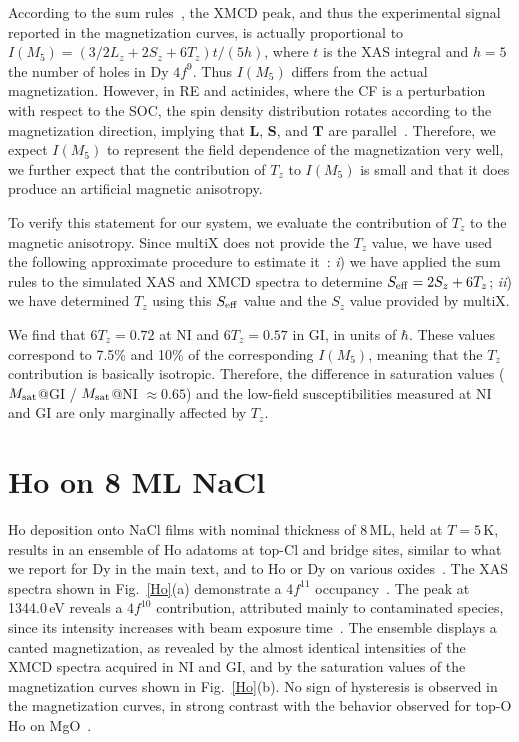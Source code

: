 {According to the sum rules~\cite{tho92, car93}, the XMCD peak, and thus the experimental signal reported in the magnetization curves, is actually proportional to $I(M_5) = (3/2L_z +2S_z + 6T_z)t/(5h)$, where $t$ is the XAS integral and $h=5$ the number of holes in Dy $4f^9$. Thus $I(M_5)$ differs from the actual magnetization. However, in RE and actinides, where the CF is a perturbation with respect to the SOC, the spin density distribution rotates according to the magnetization direction, implying that $\mathbf{L}$, $\mathbf{S}$, and $\mathbf{T}$ are parallel~\cite{ogu04}. Therefore, we expect $I(M_5)$ to represent the field dependence of the magnetization very well, we further expect that the contribution of $T_z$ to $I(M_5)$ is small and that it does produce an artificial magnetic anisotropy.

To verify this statement for our system, we evaluate the contribution of $T_z$ to the magnetic anisotropy. Since multiX does not provide the $T_z$ value, we have used the following approximate procedure to estimate it~\cite{sin17}:
\textit{i}) we have applied the sum rules to the simulated XAS and XMCD spectra to determine $S_{\rm eff}= 2S_z +6T_z$; \textit{ii}) we have determined $T_z$ using this $S_{\rm eff}$ value and the $S_z$ value provided by multiX.

We find that $6T_z= 0.72$ at NI and $6T_z= 0.57$ in GI, in units of $\hbar$. These values correspond to 7.5\% and 10\% of the corresponding $I(M_5)$, meaning that the $T_z$ contribution is basically isotropic. Therefore, the difference in saturation values ($M_{\rm sat}$@GI / $M_{\rm sat}$@NI $ \approx 0.65$) and the low-field susceptibilities
measured at NI and GI are only marginally affected by $T_z$.






\section{H\lowercase{o on} 8 ML N\lowercase{a}C\lowercase{l}}
\label{secHo}

Ho deposition onto NaCl films with nominal thickness of 8\,ML, held at $T=5$\,K, results in an ensemble of Ho adatoms at top-Cl and bridge sites, similar to what we report for Dy in the main text, and to Ho or Dy on various oxides~\cite{don21, bel22, sor23}. The XAS spectra shown in Fig.~\ref{Ho}(a) demonstrate a $4f^{11}$ occupancy~\cite{bal16, sin17, don21}. The peak at 1344.0\,eV reveals a $4f^{10}$ contribution, attributed mainly to contaminated species, since its intensity increases with beam exposure time~\cite{bal16, bal18}. The ensemble displays a canted magnetization, as revealed by the almost identical intensities of the XMCD spectra acquired in NI and GI, and by the saturation values of the magnetization curves shown in Fig.~\ref{Ho}(b). No sign of hysteresis is observed in the magnetization curves, in strong contrast with the behavior observed for top-O Ho on MgO~\cite{don16}.

}
